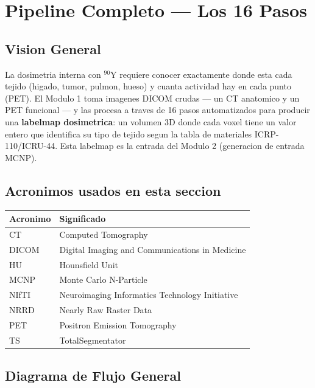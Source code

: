 \documentclass[12pt,a4paper]{article}
\begin{document}
\newpage

\tableofcontents
\newpage

\section{Pipeline Completo --- Los 16 Pasos}

\subsection{Vision General}

La dosimetria interna con $^{90}$Y requiere conocer exactamente donde esta cada tejido (higado,
tumor, pulmon, hueso) y cuanta actividad hay en cada punto (PET). El Modulo 1 toma imagenes
DICOM crudas --- un CT anatomico y un PET funcional --- y las procesa a traves de 16 pasos
automatizados para producir una \textbf{labelmap dosimetrica}: un volumen 3D donde cada voxel
tiene un valor entero que identifica su tipo de tejido segun la tabla de materiales
ICRP-110/ICRU-44. Esta labelmap es la entrada del Modulo 2 (generacion de entrada MCNP).

\subsection*{Acronimos usados en esta seccion}
\begin{tabular}{ll}
\toprule
\textbf{Acronimo} & \textbf{Significado} \\
\midrule
CT & Computed Tomography \\
DICOM & Digital Imaging and Communications in Medicine \\
HU & Hounsfield Unit \\
MCNP & Monte Carlo N-Particle \\
NIfTI & Neuroimaging Informatics Technology Initiative \\
NRRD & Nearly Raw Raster Data \\
PET & Positron Emission Tomography \\
TS & TotalSegmentator \\
\bottomrule
\end{tabular}

\subsection{Diagrama de Flujo General}
\end{document}
